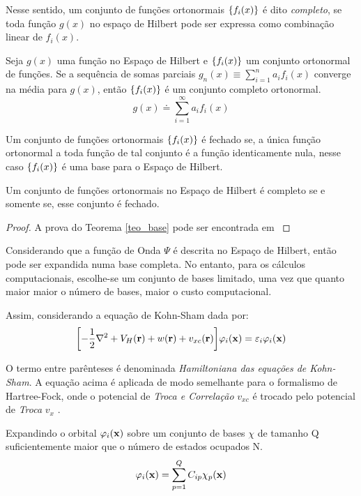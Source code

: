 Nesse sentido, um conjunto de funções ortonormais $ \Bqty{f_i(x)} $ é dito \textit{completo}, se toda função $ g(x) $ no espaço de Hilbert pode ser expressa como combinação linear de $ f_i(x) $.
\begin{mydef}
	Seja $ g(x) $ uma função no Espaço de Hilbert e $ \Bqty{f_i(x)} $ um conjunto ortonormal de funções. Se a sequência de somas parciais $ g_n(x)\equiv\sum_{i=1}^{n}a_if_i(x) $ converge na média para $ g(x) $, então $ \Bqty{f_i(x)} $ é um conjunto completo ortonormal.
	\begin{equation}
		g(x)\doteq\sum_{i=1}^{\infty} a_if_i(x)
	\end{equation}
\end{mydef}
\begin{mydef}
	Um conjunto de funções ortonormais $ \Bqty{f_i(x)} $ é fechado se, a única função ortonormal a toda função de tal conjunto é a função identicamente nula, nesse caso $ \Bqty{f_i(x)} $ é uma base para o Espaço de Hilbert.
\end{mydef}
\begin{teo}\label{teo_base}
	Um conjunto de funções ortonormais no Espaço de Hilbert é completo se e somente se, esse conjunto é fechado.
\end{teo}
\begin{proof}
	A prova do Teorema \ref{teo_base} pode ser encontrada em \cite[Cap. 5,p. 222]{byron} 
\end{proof}

Considerando que a função de Onda $ \Psi $ é descrita no Espaço de Hilbert, então pode ser expandida numa base completa. No entanto, para os cálculos computacionais, escolhe-se um conjunto de bases limitado, uma vez que quanto maior maior o número de bases, maior o custo computacional.

Assim, considerando a equação de Kohn-Sham dada por:
\begin{equation}\label{eq:base_eq1}
	\bqty{-\frac{1}{2}\laplacian+V_H(\vb{r})+w(\vb{r})+v_{xc}(\vb{r})}\orbital=\varepsilon_i\orbital
\end{equation}

O termo entre parênteses é denominada\textit{ Hamiltoniana das equações de Kohn-Sham}. A equação acima é aplicada de modo semelhante para o formalismo de Hartree-Fock, onde o potencial de \textit{Troca e Correlação} $ v_{xc} $ é trocado pelo potencial de \textit{Troca} $ v_x $ \cite{book_HF_2}.

Expandindo o orbital $ \varphi_{i}(\vb{x}) $ sobre um conjunto de bases $ \chi $ de tamanho Q suficientemente maior que o número de estados ocupados N.
\begin{equation}
	\varphi_{i}(\vb{x})=\sum_{p=1}^{Q} C_{ip}\chi_p(\vb{x})
\end{equation}

